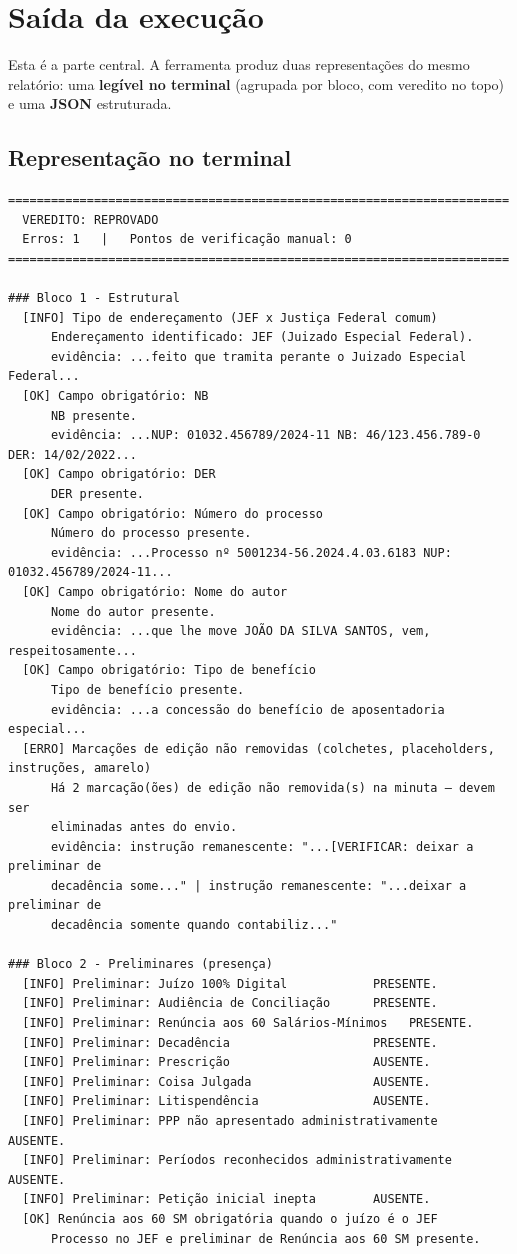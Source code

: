 \documentclass[11pt,a4paper]{article}
\begin{document}
\section{Saída da execução}

Esta é a parte central. A ferramenta produz duas representações do mesmo
relatório: uma \textbf{legível no terminal} (agrupada por bloco, com veredito no
topo) e uma \textbf{JSON} estruturada.

\subsection{Representação no terminal}
\begin{lstlisting}[style=terminal]
======================================================================
  VEREDITO: REPROVADO
  Erros: 1   |   Pontos de verificação manual: 0
======================================================================

### Bloco 1 - Estrutural
  [INFO] Tipo de endereçamento (JEF x Justiça Federal comum)
      Endereçamento identificado: JEF (Juizado Especial Federal).
      evidência: ...feito que tramita perante o Juizado Especial Federal...
  [OK] Campo obrigatório: NB
      NB presente.
      evidência: ...NUP: 01032.456789/2024-11 NB: 46/123.456.789-0 DER: 14/02/2022...
  [OK] Campo obrigatório: DER
      DER presente.
  [OK] Campo obrigatório: Número do processo
      Número do processo presente.
      evidência: ...Processo nº 5001234-56.2024.4.03.6183 NUP: 01032.456789/2024-11...
  [OK] Campo obrigatório: Nome do autor
      Nome do autor presente.
      evidência: ...que lhe move JOÃO DA SILVA SANTOS, vem, respeitosamente...
  [OK] Campo obrigatório: Tipo de benefício
      Tipo de benefício presente.
      evidência: ...a concessão do benefício de aposentadoria especial...
  [ERRO] Marcações de edição não removidas (colchetes, placeholders, instruções, amarelo)
      Há 2 marcação(ões) de edição não removida(s) na minuta — devem ser
      eliminadas antes do envio.
      evidência: instrução remanescente: "...[VERIFICAR: deixar a preliminar de
      decadência some..." | instrução remanescente: "...deixar a preliminar de
      decadência somente quando contabiliz..."

### Bloco 2 - Preliminares (presença)
  [INFO] Preliminar: Juízo 100% Digital            PRESENTE.
  [INFO] Preliminar: Audiência de Conciliação      PRESENTE.
  [INFO] Preliminar: Renúncia aos 60 Salários-Mínimos   PRESENTE.
  [INFO] Preliminar: Decadência                    PRESENTE.
  [INFO] Preliminar: Prescrição                    AUSENTE.
  [INFO] Preliminar: Coisa Julgada                 AUSENTE.
  [INFO] Preliminar: Litispendência                AUSENTE.
  [INFO] Preliminar: PPP não apresentado administrativamente   AUSENTE.
  [INFO] Preliminar: Períodos reconhecidos administrativamente AUSENTE.
  [INFO] Preliminar: Petição inicial inepta        AUSENTE.
  [OK] Renúncia aos 60 SM obrigatória quando o juízo é o JEF
      Processo no JEF e preliminar de Renúncia aos 60 SM presente.


\end{lstlisting}
\end{document}
